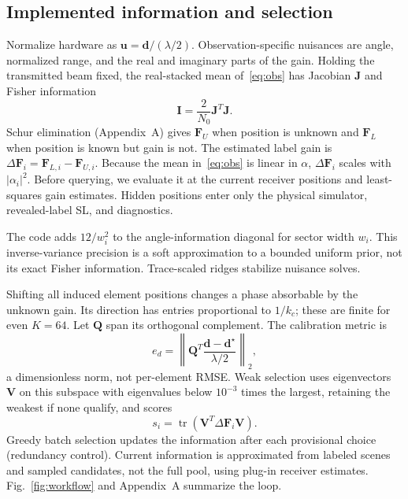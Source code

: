 \documentclass[conference]{IEEEtran}
\newcommand{\F}{\mathbf{F}}
\newcommand{\J}{\mathbf{J}}
\begin{document}
\subsection{Implemented information and selection}
Normalize hardware as $\mathbf u=\mathbf d/(\lambda/2)$. Observation-specific nuisances are angle, normalized range, and the real and imaginary parts of the gain. Holding the transmitted beam fixed, the real-stacked mean of~\eqref{eq:obs} has Jacobian $\J$ and Fisher information
\begin{equation}
 \mathbf I=\frac{2}{N_0}\J^T\J.
\end{equation}
Schur elimination (Appendix~A) gives $\F_U$ when position is unknown and $\F_L$ when position is known but gain is not. The estimated label gain is $\Delta\F_i=\F_{L,i}-\F_{U,i}$. Because the mean in~\eqref{eq:obs} is linear in $\alpha$, $\Delta\F_i$ scales with $|\alpha_i|^2$. Before querying, we evaluate it at the current receiver positions and least-squares gain estimates. Hidden positions enter only the physical simulator, revealed-label SL, and diagnostics.

The code adds $12/w_i^2$ to the angle-information diagonal for sector width $w_i$. This inverse-variance precision is a soft approximation to a bounded uniform prior, not its exact Fisher information. Trace-scaled ridges stabilize nuisance solves.

Shifting all induced element positions changes a phase absorbable by the unknown gain. Its direction has entries proportional to $1/k_c$; these are finite for even $K=64$. Let $\mathbf Q$ span its orthogonal complement. The calibration metric is
\begin{equation}
 e_d=\left\|\mathbf Q^T
       \frac{\widehat{\mathbf d}-\mathbf d^\star}{\lambda/2}\right\|_2,
 \label{eq:calib}
\end{equation}
a dimensionless norm, not per-element RMSE. Weak selection uses eigenvectors $\mathbf V$ on this subspace with eigenvalues below $10^{-3}$ times the largest, retaining the weakest if none qualify, and scores
\begin{equation}
 s_i=\operatorname{tr}(\mathbf V^T\Delta\F_i\mathbf V).
 \label{eq:score}
\end{equation}
Greedy batch selection updates the information after each provisional choice (redundancy control). Current information is approximated from labeled scenes and sampled candidates, not the full pool, using plug-in receiver estimates. Fig.~\ref{fig:workflow} and Appendix~A summarize the loop.
\end{document}
